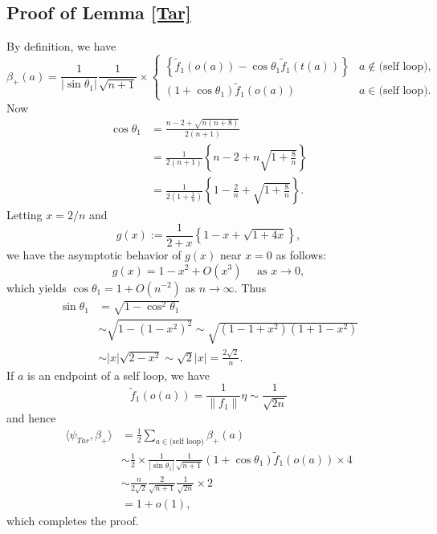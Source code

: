 \documentclass[a4paper,12pt]{article}
\numberwithin{equation}{section}
\begin{document}
\subsection{Proof of Lemma \ref{Tar}}
\label{section-Tar}
By definition, we have
\begin{equation*}
\beta_+(a) = \frac{1}{|\sin \theta_1|}\frac{1}{\sqrt{n+1}}\times
	\begin{cases}
	\left\{\tilde f_1(o(a)) - \cos \theta_1 \tilde f_1(t(a))\right\} & \text{$a\not \in \text{(self loop)}$},\\
	(1+\cos \theta_1) \tilde f_1(o(a)) & \text{$a \in \text{(self loop)}$}.
\end{cases}
\end{equation*}
Now
\begin{align*}
\cos\theta_1 &= \frac{n-2 + \sqrt{n(n+8)}}{2(n+1)}\\
	&= \frac{1}{2(n+1)} \left\{n-2 + n\sqrt{1+\frac{8}{n}}\right\}\\
	&= \frac{1}{2\left(1+\frac{1}{n}\right)} \left\{1-\frac{2}{n} + \sqrt{ 1+\frac{8}{n} }\right\}.
\end{align*}
Letting $x = 2/n$ and 
\begin{equation*}
g(x) := \frac{1}{2+x}\left\{1- x + \sqrt{ 1+4x }\right\},
\end{equation*}
we have the asymptotic behavior of $g(x)$ near $x=0$ as follows:
\begin{equation*}
g(x) = 1-x^2 + O(x^3)\quad \text{ as }x\to 0,
\end{equation*}
which yields $\cos \theta_1 = 1+O(n^{-2})$ as $n\to \infty$.
Thus 
\begin{align*}
\sin \theta_1 &= \sqrt{1-\cos^2\theta_1}\\
	&\sim \sqrt{1-(1-x^2)^2} \sim \sqrt{(1-1+x^2)(1+1-x^2)}\\
	&\sim |x|\sqrt{2-x^2} \sim \sqrt{2}|x| = \frac{2\sqrt{2}}{n}.
\end{align*}
If $a$ is an endpoint of a self loop, we have
\begin{equation*}
\tilde f_1(o(a)) = \frac{1}{\|f_1\|}\eta \sim \frac{1}{\sqrt{2n}}
\end{equation*}
and hence
\begin{align*}
\langle \psi_{Tar}, \beta_+\rangle &= \frac{1}{2} \sum_{a\in \text{(self loop)}} \beta_+ (a)\\
	&\sim \frac{1}{2} \times \frac{1}{|\sin \theta_1|}\frac{1}{\sqrt{n+1}}(1+\cos \theta_1) \tilde f_1(o(a)) \times 4\\
	&\sim \frac{n}{2\sqrt{2}} \frac{2}{\sqrt{n+1}} \frac{1}{\sqrt{2n}} \times 2\\
	&= 1+o(1),
\end{align*}
which completes the proof.
\end{document}
